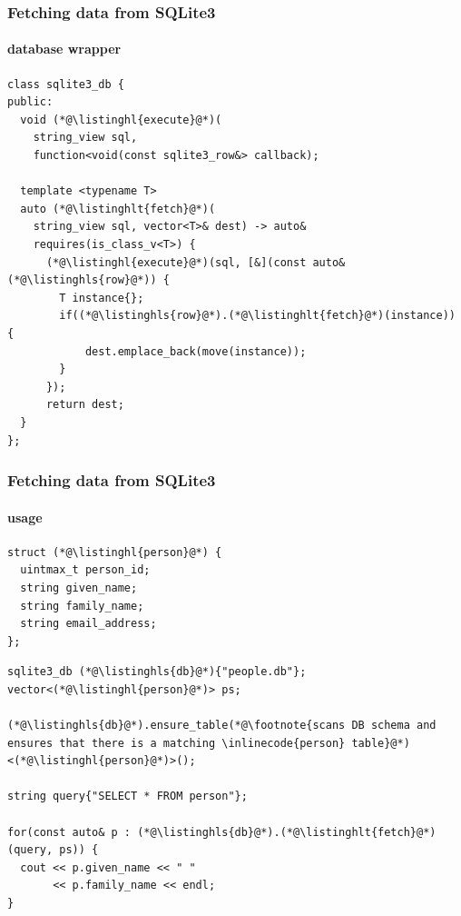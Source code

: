 \documentclass[compress,table,xcolor=table]{beamer}
\begin{document}
\begin{frame}[fragile]
  \frametitle{Fetching data from SQLite3}
  \framesubtitle{database wrapper}
  \begin{lstlisting}[language=c++2x,basicstyle=\footnotesize\ttfamily]
class sqlite3_db {
public:
  void (*@\listinghl{execute}@*)(
    string_view sql,
    function<void(const sqlite3_row&> callback);

  template <typename T>
  auto (*@\listinghlt{fetch}@*)(
    string_view sql, vector<T>& dest) -> auto&
    requires(is_class_v<T>) {
      (*@\listinghl{execute}@*)(sql, [&](const auto& (*@\listinghls{row}@*)) {
        T instance{};
        if((*@\listinghls{row}@*).(*@\listinghlt{fetch}@*)(instance)) {
            dest.emplace_back(move(instance));
        }
      });
      return dest;
  }
};
  \end{lstlisting}
\end{frame}
\begin{frame}[fragile]
  \frametitle{Fetching data from SQLite3}
  \framesubtitle{usage}
  \begin{lstlisting}[language=c++2x,basicstyle=\footnotesize\ttfamily]
struct (*@\listinghl{person}@*) {
  uintmax_t person_id;
  string given_name;
  string family_name;
  string email_address;
};
  \end{lstlisting}
  \begin{lstlisting}[language=c++2x,basicstyle=\footnotesize\ttfamily]
sqlite3_db (*@\listinghls{db}@*){"people.db"};
vector<(*@\listinghl{person}@*)> ps;

(*@\listinghls{db}@*).ensure_table(*@\footnote{scans DB schema and ensures that there is a matching \inlinecode{person} table}@*)<(*@\listinghl{person}@*)>();

string query{"SELECT * FROM person"};

for(const auto& p : (*@\listinghls{db}@*).(*@\listinghlt{fetch}@*)(query, ps)) {
  cout << p.given_name << " "
       << p.family_name << endl;
}
  \end{lstlisting}
\end{frame}
\end{document}
